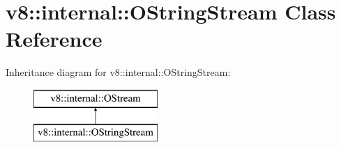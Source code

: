 \hypertarget{classv8_1_1internal_1_1_o_string_stream}{}\section{v8\+:\+:internal\+:\+:O\+String\+Stream Class Reference}
\label{classv8_1_1internal_1_1_o_string_stream}
Inheritance diagram for v8\+:\+:internal\+:\+:O\+String\+Stream\+:\begin{figure}[H]
\begin{center}
\leavevmode
\includegraphics[height=2.000000cm]{classv8_1_1internal_1_1_o_string_stream}
\end{center}
\end{figure}

